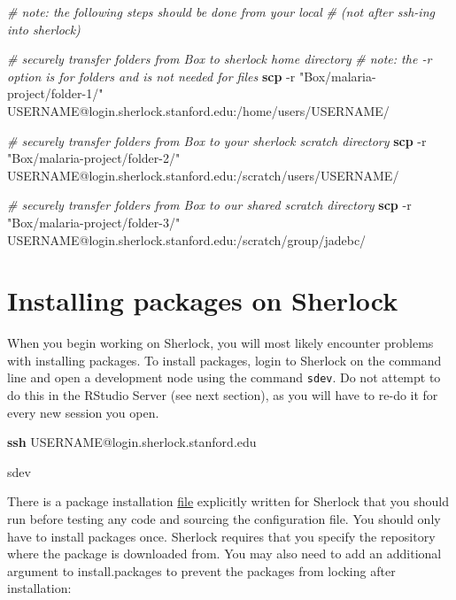 \documentclass[
]{book}
\newenvironment{Shaded}{\begin{snugshade}}{\end{snugshade}}
\newcommand{\AttributeTok}[1]{\textcolor[rgb]{0.13,0.29,0.53}{#1}}
\newcommand{\CommentTok}[1]{\textcolor[rgb]{0.56,0.35,0.01}{\textit{#1}}}
\newcommand{\ExtensionTok}[1]{#1}
\newcommand{\FunctionTok}[1]{\textcolor[rgb]{0.13,0.29,0.53}{\textbf{#1}}}
\newcommand{\NormalTok}[1]{#1}
\newcommand{\StringTok}[1]{\textcolor[rgb]{0.31,0.60,0.02}{#1}}
\begin{document}
\begin{Shaded}
\begin{Highlighting}[]
\CommentTok{\# note: the following steps should be done from your local }
\CommentTok{\# (not after ssh{-}ing into sherlock)}

\CommentTok{\# securely transfer folders from Box to sherlock home directory}
\CommentTok{\# note: the {-}r option is for folders and is not needed for files}
\FunctionTok{scp} \AttributeTok{{-}r} \StringTok{"Box/malaria{-}project/folder{-}1/"}\NormalTok{ USERNAME@login.sherlock.stanford.edu:/home/users/USERNAME/}

\CommentTok{\# securely transfer folders from Box to your sherlock scratch directory}
\FunctionTok{scp} \AttributeTok{{-}r} \StringTok{"Box/malaria{-}project/folder{-}2/"}\NormalTok{ USERNAME@login.sherlock.stanford.edu:/scratch/users/USERNAME/}

\CommentTok{\# securely transfer folders from Box to our shared scratch directory}
\FunctionTok{scp} \AttributeTok{{-}r} \StringTok{"Box/malaria{-}project/folder{-}3/"}\NormalTok{ USERNAME@login.sherlock.stanford.edu:/scratch/group/jadebc/}
\end{Highlighting}
\end{Shaded}

\section{Installing packages on Sherlock}\label{installing-packages-on-sherlock}

When you begin working on Sherlock, you will most likely encounter problems with installing packages. To install packages, login to Sherlock on the command line and open a development node using the command \texttt{sdev}. Do not attempt to do this in the RStudio Server (see next section), as you will have to re-do it for every new session you open.

\begin{Shaded}
\begin{Highlighting}[]
\FunctionTok{ssh}\NormalTok{ USERNAME@login.sherlock.stanford.edu}

\ExtensionTok{sdev}
\end{Highlighting}
\end{Shaded}

There is a package installation \href{https://drive.google.com/file/d/1eybh4j_G-r3pMZBCVA4QHoWZBo_cW5zb/view}{file} explicitly written for Sherlock that you should run before testing any code and sourcing the configuration file. You should only have to install packages once. Sherlock requires that you specify the repository where the package is downloaded from. You may also need to add an additional argument to install.packages to prevent the packages from locking after installation:
\end{document}
